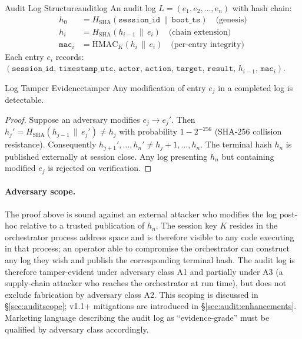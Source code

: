 \documentclass[11pt,a4paper]{report}
\begin{document}
\begin{definition}{Audit Log Structure}{auditlog}
An audit log $L = (e_1, e_2, \ldots, e_n)$ with hash chain:
\begin{align*}
  h_0 &= H_{\mathrm{SHA}}(\mathtt{session\_id} \,\|\, \mathtt{boot\_ts}) \quad \text{(genesis)} \\
  h_i &= H_{\mathrm{SHA}}(h_{i-1} \,\|\, e_i) \quad \text{(chain extension)} \\
  \mathtt{mac}_i &= \mathrm{HMAC}_K(h_i \,\|\, e_i) \quad \text{(per-entry integrity)}
\end{align*}
Each entry $e_i$ records: $(\mathtt{session\_id},\, \mathtt{timestamp\_utc},\, \mathtt{actor},\, \mathtt{action},\, \mathtt{target},\, \mathtt{result},\, h_{i-1},\, \mathtt{mac}_i)$.
\end{definition}

\begin{theorem}{Log Tamper Evidence}{tamper}
Any modification of entry $e_j$ in a completed log is detectable.
\end{theorem}

\begin{proof}
Suppose an adversary modifies $e_j \to e_j'$. Then $h_j' = H_{\mathrm{SHA}}(h_{j-1} \,\|\, e_j') \neq h_j$ with probability $1 - 2^{-256}$ (SHA-256 collision resistance). Consequently $h_{j+1}', \ldots, h_n' \neq h_j+1, \ldots, h_n$. The terminal hash $h_n$ is published externally at session close. Any log presenting $h_n$ but containing modified $e_j$ is rejected on verification.
\end{proof}

\paragraph{Adversary scope.} The proof above is sound against an external attacker who modifies the log post-hoc relative to a trusted publication of $h_n$. The session key $K$ resides in the orchestrator process address space and is therefore visible to any code executing in that process; an operator able to compromise the orchestrator can construct any log they wish and publish the corresponding terminal hash. The audit log is therefore tamper-evident under adversary class A1 and partially under A3 (a supply-chain attacker who reaches the orchestrator at run time), but does not exclude fabrication by adversary class A2. This scoping is discussed in \S\ref{sec:auditscope}; v1.1+ mitigations are introduced in \S\ref{sec:audit:enhancements}. Marketing language describing the audit log as ``evidence-grade'' must be qualified by adversary class accordingly.
\end{document}
